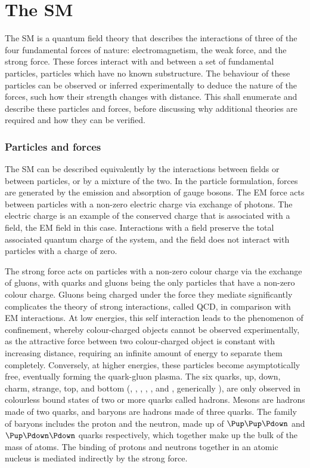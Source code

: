 \chapter{The \acl{SM}}
\label{chap:intro:sm}

The \acf{SM} is a quantum field theory that describes the interactions of three 
of the four fundamental forces of nature: electromagnetism, the weak force, and 
the strong force.
These forces interact with and between a set of fundamental particles, 
particles which have no known substructure.
The behaviour of these particles can be observed or inferred experimentally to 
deduce the nature of the forces, such how their strength changes with distance.
This  shall enumerate and describe these particles and 
forces, before discussing why additional theories are required and how they can 
be verified.

\subsection{Particles and forces}

The \ac{SM} can be described equivalently by the interactions between fields or 
between particles, or by a mixture of the two.
In the particle formulation, forces are generated by the emission and 
absorption of gauge bosons.
The \ac{EM} force acts between particles with a non-zero electric charge via 
exchange of photons.
The electric charge is an example of the conserved charge that is associated 
with a field, the \ac{EM} field in this case.
Interactions with a field preserve the total associated quantum charge of the 
system, and the field does not interact with particles with a charge of zero.

The strong force acts on particles with a non-zero colour charge via the 
exchange of gluons, with quarks and gluons being the only particles that have a 
non-zero colour charge.
Gluons being charged under the force they mediate significantly complicates the 
theory of strong interactions, called \ac{QCD}, in comparison with \ac{EM} 
interactions.
At low energies, this self interaction leads to the phenomenon of confinement, 
whereby colour-charged objects cannot be observed experimentally, as the 
attractive force between two colour-charged object is constant with increasing 
distance, requiring an infinite amount of energy to separate them completely.
Conversely, at higher energies, these particles become asymptotically free, 
eventually forming the quark-gluon plasma.
The six quarks, up, down, charm, strange, top, and bottom (\Pup, \Pdown, 
\Pcharm, \Pstrange, \Ptop, and \Pbottom, generically \Pquark), are only 
observed in colourless bound states of two or more quarks called hadrons.
Mesons are hadrons made of two quarks, and baryons are hadrons made of three 
quarks.
The family of baryons includes the proton and the neutron, made up of 
$\Pup\Pup\Pdown$ and $\Pup\Pdown\Pdown$ quarks respectively, which together 
make up the bulk of the mass of atoms.
The binding of protons and neutrons together in an atomic nucleus is mediated 
indirectly by the strong force.

